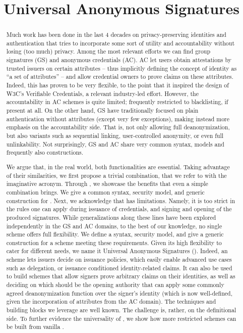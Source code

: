 \documentclass{llncs}%
\title{Universal Anonymous Signatures}
\author{}
\begin{document}
\maketitle


\begin{abstract}
  Much work has been done in the last 4 decades on privacy-preserving
  identities and authentication that tries to incorporate some sort of utility
  and accountability without losing (too much) privacy. Among the most relevant
  efforts we can find group signatures (GS) and anonymous credentials (AC).
  AC let users obtain attestations by trusted
  issuers on certain attributes -- thus implicitly defining the concept of
  identity as ``a set of attributes'' -- and allow credential owners to prove
  claims on these attributes. Indeed, this has proven to be very
  flexible, to the point that it inspired the design of W3C's
  Verifiable Credentials, a relevant industry-led effort. However, the
  accountability in AC schemes is quite limited; frequently restricted to
  blacklisting, if present at all.
  On the other hand, GS have traditionally focused on plain
  authentication without attributes (except very few exceptions), making instead
  more emphasis on the accountability side. That is, not only allowing full
  deanonymization, but also variants such as sequential linking, user-controlled
  anonymity, or even full unlinkability.
  Not surprisingly, GS and AC share very common syntax, models and frequently
  also constructions.

  We argue that, in the real world, both functionalities are essential. Taking
  advantage of their similarities, we first propose a trivial combination, that
  we refer to with the imaginative \GSAC acronym. Through \GSAC, we showcase
  the benefits that even a simple combination brings. We give a common syntax,
  security model, and generic construction for \GSAC.
  Next, we acknowledge that \GSAC has limitations. Namely, it is too
  strict in the rules one can apply during issuance of credentials, and signing
  and opening of the produced signatures. While generalizations along these
  lines have been explored independently in the GS and AC domains, to the best
  of our knowledge, no single scheme offers full flexibility.
  We define a syntax, security model, and give a generic
  construction for a scheme meeting these requirements. Given its high
  flexibility to cater for different needs, we name it Universal Anonymous
  Signatures (\UAS). Indeed, an \UAS scheme lets issuers decide on issuance
  policies, which easily enable advanced use cases such as delegation, or
  issuance conditioned identity-related claims. It can also be used to build
  schemes that allow signers prove arbitrary claims on their identities, as well
  as deciding on which should be the opening authority that can apply some
  commonly agreed deanonymization function over the signer's identity (which is
  now well-defined, given the incorporation of attributes from the AC domain).
  The techniques and building blocks we leverage are well known. The challenge
  is, rather, on the definitional side. To further evidence the universality of
  \UAS, we show how more restricted schemes can be built from vanilla \UAS.
\end{abstract}
\end{document}
